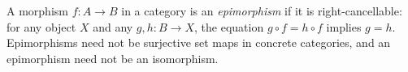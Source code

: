 
A morphism $f:A\to B$ in a category is an \emph{epimorphism} if it is right-cancellable: for any object $X$ and any $g,h:B\to X$, the equation $g\circ f=h\circ f$ implies $g=h$. Epimorphisms need not be surjective set maps in concrete categories, and an epimorphism need not be an isomorphism.
